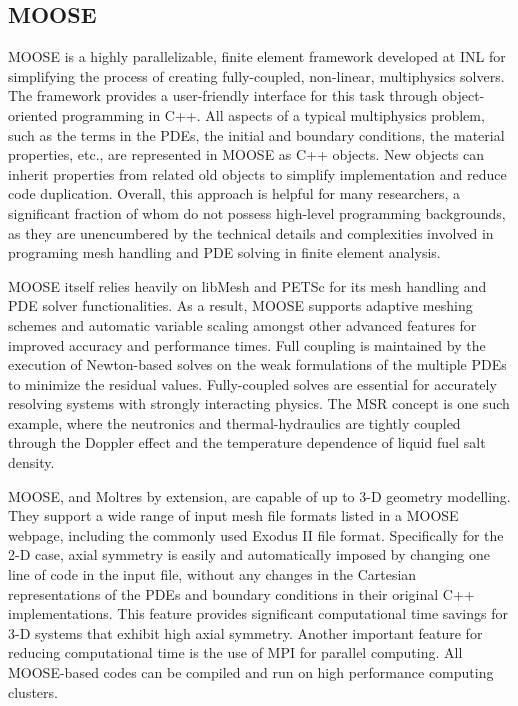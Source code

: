 \subsection{MOOSE}

\gls{MOOSE} \cite{gaston_physics-based_2015} is a highly parallelizable,
finite element framework developed at \gls{INL} for simplifying the process of
creating fully-coupled, non-linear, multiphysics solvers. The framework
provides a user-friendly interface for this task through object-oriented
programming in C++. All aspects of a typical multiphysics problem, such as the
terms in the \glspl{PDE}, the initial and boundary conditions, the material
properties, etc., are represented in \gls{MOOSE} as C++ objects. New objects
can inherit properties from related old objects to simplify implementation and
reduce code duplication. Overall, this approach
is helpful for many researchers, a significant fraction of whom do not possess
high-level programming backgrounds, as they are unencumbered by the
technical details and complexities involved in programing mesh handling
and \gls{PDE} solving in finite element analysis.

\gls{MOOSE} itself relies heavily on libMesh \cite{kirk_libmesh:_2006} and
PETSc \cite{satish_petsc_2019} for its mesh handling and \gls{PDE} solver
functionalities. As a result, \gls{MOOSE} supports adaptive meshing schemes
and automatic variable scaling amongst other advanced features for improved
accuracy and performance times. Full
coupling is maintained by the execution of Newton-based solves on the
weak formulations of the multiple \glspl{PDE} to minimize the residual values.
Fully-coupled solves are essential for accurately resolving systems with
strongly interacting physics. The \gls{MSR} concept is one such example, where
the neutronics and thermal-hydraulics are tightly coupled through the Doppler
effect and the temperature dependence of liquid fuel salt density.

\gls{MOOSE}, and Moltres by extension, are capable of up to 3-D geometry
modelling. They support a wide range of input mesh file formats listed in a
\gls{MOOSE} webpage, including the commonly used Exodus II file format.
Specifically for the 2-D case, axial symmetry is easily and automatically
imposed by changing one line of code in the input file, without any changes in
the Cartesian representations of the \glspl{PDE} and boundary conditions in
their original C++ implementations. This feature provides significant
computational time savings for 3-D systems that exhibit high axial symmetry.
Another important feature for reducing computational time is the use of MPI
for parallel computing. All \gls{MOOSE}-based codes can be compiled and
run on high performance computing clusters.

